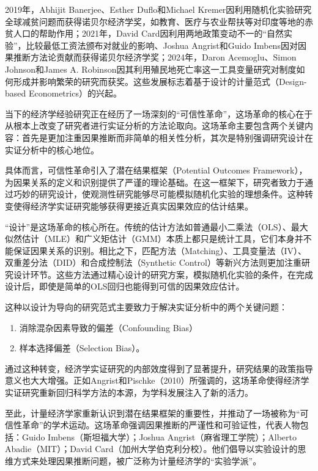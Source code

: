 2019年，Abhijit Banerjee、Esther Duflo和Michael Kremer因利用随机化实验研究全球减贫问题而获得诺贝尔经济学奖，如教育、医疗与农业帮扶等对印度等地的赤贫人口的帮助作用；2021年，David Card因利用两地政策变动不一的“自然实验”，比较最低工资法颁布对就业的影响、Joshua Angrist和Guido Imbens因对因果推断方法论贡献而获得诺贝尔经济学奖；2024年，Daron Acemoglu、Simon Johnson和James A. Robinson因其利用殖民地死亡率这一工具变量研究对制度如何形成并影响繁荣的研究而获奖。这些发展标志着基于设计的计量范式（Design-based Econometrics）的兴起。

当下的经济学经验研究正在经历了一场深刻的“可信性革命”，这场革命的核心在于从根本上改变了研究者进行实证分析的方法论取向。这场革命主要包含两个关键内容：首先是更加注重因果推断而非简单的相关性分析，其次是特别强调研究设计在实证分析中的核心地位。

具体而言，可信性革命引入了潜在结果框架（Potential Outcomes Framework），为因果关系的定义和识别提供了严谨的理论基础。在这一框架下，研究者致力于通过巧妙的研究设计，使观测性研究能够尽可能模拟随机化实验的理想条件。这种转变使得经济学实证研究能够获得更接近真实因果效应的估计结果。

“设计”是这场革命的核心所在。传统的估计方法如普通最小二乘法（OLS）、最大似然估计（MLE）和广义矩估计（GMM）本质上都只是统计工具，它们本身并不能保证因果关系的识别。相比之下，匹配方法（Matching）、工具变量法（IV）、双重差分法（DID）和合成控制法（Synthetic Control）等新兴方法则更加注重研究设计环节。这些方法通过精心设计的研究方案，模拟随机化实验的条件，在完成设计后，即使是简单的OLS回归也能得到可信的因果效应估计。

这种以设计为导向的研究范式主要致力于解决实证分析中的两个关键问题：
\begin{enumerate}
	\item 消除混杂因素导致的偏差（Confounding Bias）
	\item 样本选择偏差（Selection Bias）。
\end{enumerate}

通过这种转变，经济学实证研究的内部效度得到了显著提升，研究结果的政策指导意义也大大增强。正如Angrist和Pischke（2010）所强调的，这场革命使得经济学实证研究重新回归科学方法的本源，为学科发展注入了新的活力。

至此，计量经济学家重新认识到潜在结果框架的重要性，并推动了一场被称为“可信性革命”的学术运动。这场革命强调因果推断的严谨性和可验证性，代表人物包括：Guido Imbens（斯坦福大学）；Joshua Angrist（麻省理工学院）；Alberto Abadie（MIT）；David Card（加州大学伯克利分校）。他们倡导以实验设计的思维方式来处理因果推断问题，被广泛称为计量经济学的“实验学派”。

